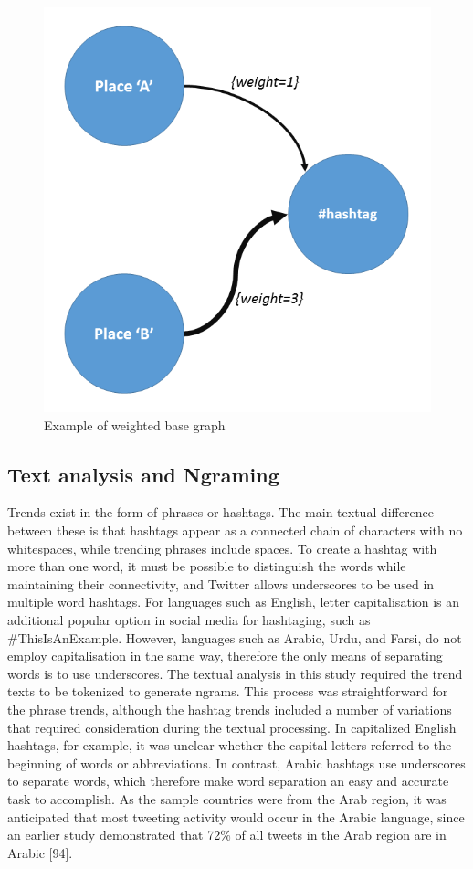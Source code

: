 \documentclass[conference]{IEEEtran}
\begin{document}
\begin{figure}[htb] \centering
\includegraphics[width=\columnwidth]{images/base_graph.png}
\caption{Example of weighted base graph}
\label{fig:basegraph}
\end{figure}


\subsection{Text analysis and Ngraming}
Trends exist in the form of phrases or hashtags. The main textual 
difference between these is that hashtags appear as a connected 
chain of characters with no whitespaces, while trending phrases include 
spaces. To create a hashtag with more than one word, it must be possible 
to distinguish the words while maintaining their connectivity, and Twitter 
allows underscores to be used in multiple word hashtags. For languages 
such as English, letter capitalisation is an additional popular option in social 
media for hashtaging, such as \#ThisIsAnExample. However, languages 
such as Arabic, Urdu, and Farsi, do not employ capitalisation in the same 
way, therefore the only means of separating words is to use underscores. 
The textual analysis in this study required the trend texts to be tokenized 
to generate ngrams. This process was straightforward for the phrase trends, 
although the hashtag trends included a number of variations that required 
consideration during the textual processing. In capitalized English hashtags, 
for example, it was unclear whether the capital letters referred to the 
beginning of words or abbreviations. In contrast, Arabic hashtags use 
underscores to separate words, which therefore make word separation an 
easy and accurate task to accomplish. As the sample countries were from the 
Arab region, it was anticipated that most tweeting activity would occur in the 
Arabic language, since an earlier study demonstrated that 72\% of all tweets 
in the Arab region are in Arabic [94]. 
\end{document}
